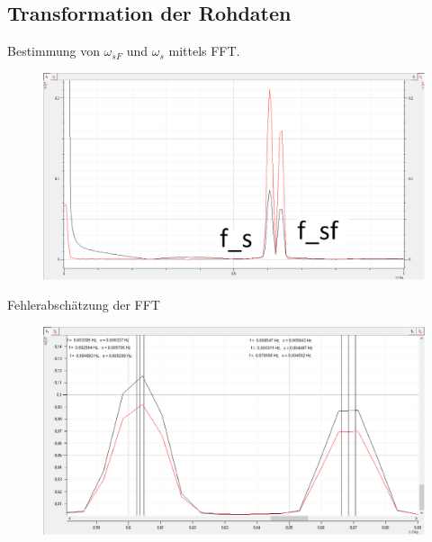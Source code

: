 \documentclass[11pt]{beamer}
\begin{document}
\subsection{Transformation der Rohdaten}
\begin{frame}{Bestimmung von $\omega_{sF} $ und $ \omega_s$ mittels FFT.}

\begin{figure}[H]
\centering
\includegraphics[scale=0.3]{Bilder/FFT-Schwebung.png}
\end{figure}
\end{frame}

\begin{frame}{Fehlerabschätzung der FFT}
\begin{figure}[H]
\centering
\includegraphics[scale=0.3]{Bilder/fft_Fehlermessung.png}
\end{figure}
\end{frame}
\end{document}
